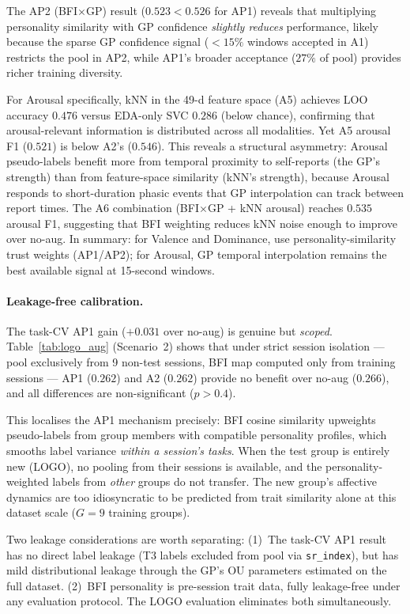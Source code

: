 \documentclass[sigconf,review,anonymous]{acmart}
\begin{document}
The AP2 (BFI$\times$GP) result ($0.523 < 0.526$ for AP1) reveals that multiplying
personality similarity with GP confidence \emph{slightly reduces} performance,
likely because the sparse GP confidence signal ($<15\%$ windows accepted in A1)
restricts the pool in AP2, while AP1's broader acceptance ($27\%$ of pool) provides
richer training diversity.

For Arousal specifically, kNN in the 49-d feature space (A5) achieves LOO
accuracy $0.476$ versus EDA-only SVC $0.286$ (below chance), confirming that
arousal-relevant information is distributed across all modalities.
Yet A5 arousal F1 ($0.521$) is below A2's ($0.546$).
This reveals a structural asymmetry: Arousal pseudo-labels benefit more from
temporal proximity to self-reports (the GP's strength) than from feature-space
similarity (kNN's strength), because Arousal responds to short-duration phasic
events that GP interpolation can track between report times.
The A6 combination (BFI$\times$GP + kNN arousal) reaches $0.535$ arousal F1,
suggesting that BFI weighting reduces kNN noise enough to improve over no-aug.
In summary: for Valence and Dominance, use personality-similarity trust weights
(AP1/AP2); for Arousal, GP temporal interpolation remains the best available
signal at 15-second windows.

\paragraph{Leakage-free calibration.}
The task-CV AP1 gain ($+0.031$ over no-aug) is genuine but \emph{scoped}.
Table~\ref{tab:logo_aug} (Scenario~2) shows that under strict session isolation
--- pool exclusively from 9 non-test sessions, BFI map computed only from
training sessions --- AP1 ($0.262$) and A2 ($0.262$) provide no benefit over
no-aug ($0.266$), and all differences are non-significant ($p > 0.4$).

This localises the AP1 mechanism precisely: BFI cosine similarity upweights
pseudo-labels from group members with compatible personality profiles, which
smooths label variance \emph{within a session's tasks}.
When the test group is entirely new (LOGO), no pooling from their sessions is
available, and the personality-weighted labels from \emph{other} groups do not
transfer.
The new group's affective dynamics are too idiosyncratic to be predicted from
trait similarity alone at this dataset scale ($G{=}9$ training groups).

Two leakage considerations are worth separating: (1)~The task-CV AP1 result has
no direct label leakage (T3 labels excluded from pool via \texttt{sr\_index}),
but has mild distributional leakage through the GP's OU parameters estimated
on the full dataset.
(2)~BFI personality is pre-session trait data, fully leakage-free under any
evaluation protocol.
The LOGO evaluation eliminates both simultaneously.
\end{document}
